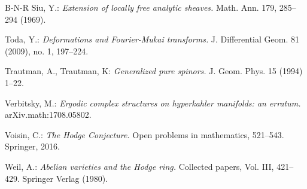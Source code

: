 \documentclass[12pt]{amsart}
\numberwithin{equation}{subsection}
\theoremstyle{plain}
\theoremstyle{definition}
\begin{document}
\begin{thebibliography}{B-N-R}
 Siu, Y.: 
{\em Extension of locally free analytic sheaves.\/} Math. Ann. 179, 285--294 (1969).


 Toda, Y.: {\em Deformations and Fourier-Mukai transforms.\/}
J. Differential Geom. 81 (2009), no. 1, 197--224.

 Trautman, A., Trautman, K: {\em Generalized pure spinors.\/} J. Geom. Phys. 15 (1994) 1--22.

 Verbitsky, M.: {\em Ergodic complex structures on hyperkahler manifolds: an erratum.\/} arXiv.math:1708.05802. 

 Voisin, C.: {\em The Hodge Conjecture.\/} Open problems in mathematics, 521--543. Springer,  2016.

 Weil, A.: {\em Abelian varieties and the Hodge ring.\/} Collected papers, Vol. III, 421--429. Springer Verlag (1980).


\end{thebibliography}
\end{document}
